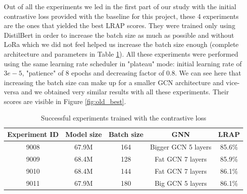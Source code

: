 Out of all the experiments we led in the first part of our study with the initial contrastive loss provided with the baseline for this project, these 4 experiments are the ones that yielded the best LRAP scores. They were trained only using DistilBert in order to increase the batch size as much as possible and without LoRa which we did not feel helped us increase the batch size enough (complete architecture and parameters in Table \ref{tab:best_exp_old_loss}). All these experiments were performed using the same learning rate scheduler in "plateau" mode: initial learning rate of $3e-5$, "patience" of 8 epochs and decreasing factor of 0.8. We can see here that increasing the batch size can make up for a smaller GCN architecture and vice-versa and we obtained very similar results with all these experiments. Their scores are visible in Figure \ref{fig:old_best}.

\begin{table}[!]
    \centering
    \begin{tabular}{|c|c|c|c|c|}
    \hline
    \textbf{Experiment ID} & \textbf{Model size} & \textbf{Batch size} & \textbf{GNN} & \textbf{LRAP} \\ \hline
    9008         & 67.9M & 164      & Bigger GCN 5 layers & 85.6\%      \\ \hline
     9009         &68.4M &  128      & Fat GCN 7 layers   & 85.9\%  \\ \hline
     9010         & 68.4M & 144      & Fat GCN 7 layers   & 86.1\%     \\ \hline
     9011        & 67.9M & 180      & Big GCN 5 layers  & 86.1\% \\ \hline

    \end{tabular}
    \caption{Successful experiments trained with the contrastive loss}
    \label{tab:best_exp_old_loss}
\end{table}

